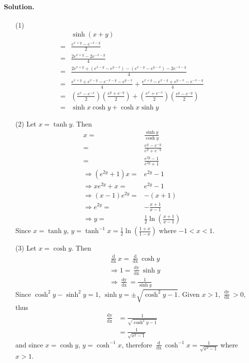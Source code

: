 \paragraph{Solution.}
\begin{itemize}
    \item [(1)]{
    \begin{align*}
		&\sinh\left(x + y\right)\\
		=& \frac{e^{x + y} - e^{- x - y}}{2}\\
		=& \frac{2e^{x + y} - 2e^{- x - y}}{4}\\
		=& \frac{2e^{x + y} + \left(e^{x - y} - e^{y - x}\right) - \left(e^{x - y} - e^{y - x}\right) - 2e^{- x - y}}{4}\\
		=& \frac{e^{x+y} + e^{x-y} - e^{-x-y} - e^{y-x}}{4} + \frac{e^{x+y} - e^{x-y} +e^{y-x} -e^{-x-y}}{4} \\
		=& \left( \frac{e^x-e^{-x}}{2} \right) \left( \frac{e^y + e^{-y}}{2} \right) + \left( \frac{e^x + e^{-x}}{2} \right) \left( \frac{e^y - e^{-y}}{2} \right)\\
		=& \sinh x \cosh y + \cosh x \sinh y
	\end{align*}
    }
    \item [(2)]{
    Let $x = \tanh y$. Then
    \begin{align*}
		x =& \frac{\sinh y}{\cosh y}\\
		=& \frac{e^y-e^{-y}}{e^y+e^{-y}}\\
		=& \frac{e^{2y}-1}{e^{2y}+1}\\
		\Rightarrow \left(e^{2y}+1\right)x =& e^{2y}-1\\
		\Rightarrow xe^{2y}+x =& e^{2y}-1\\
		\Rightarrow \left(x - 1\right)e^{2y} =& -\left(x + 1\right)\\
		\Rightarrow e^{2y} =& -\frac{x + 1}{x - 1}\\
		\Rightarrow y =& \frac{1}{2} \ln\left(\frac{x + 1}{x - 1}\right)
	\end{align*}
	Since $x = \tanh y$, $\displaystyle y = \tanh^{-1} x = \frac{1}{2} \ln\left(\frac{1 + x}{1 - x}\right)$ where $-1 < x < 1$.
    }
    \item [(3)]{
    Let $x = \cosh y$. Then
    \begin{align*}
		&\frac{\mathop{d}}{\mathop{dx}}x = \frac{\mathop{d}}{\mathop{dx}}\cosh y\\
		&\Rightarrow 1 = \frac{\mathop{dy}}{\mathop{dx}} \sinh y\\
		&\Rightarrow \frac{\mathop{dy}}{\mathop{dx}} = \frac{1}{\sinh y}
	\end{align*}
	Since $\cosh^2 y - \sinh^2 y = 1$, $\sinh y = \pm\sqrt{\cosh^2 y - 1}$. Given $x>1$, $\frac{\mathop{dy}}{\mathop{dx}} > 0$, thus
	\begin{align*}
		\frac{\mathop{dy}}{\mathop{dx}} &= \frac{1}{\sqrt{\cosh^2 y - 1}}\\
		 &= \frac{1}{\sqrt{x^2 - 1}}
	\end{align*}
	and since $x = \cosh y$, $y = \cosh^{-1} x$, therefore $\displaystyle \frac{\mathop{d}}{\mathop{dx}} \cosh^{-1} x = \frac{1}{\sqrt{x^2-1}}$ where $x > 1$.
    }
\end{itemize}

